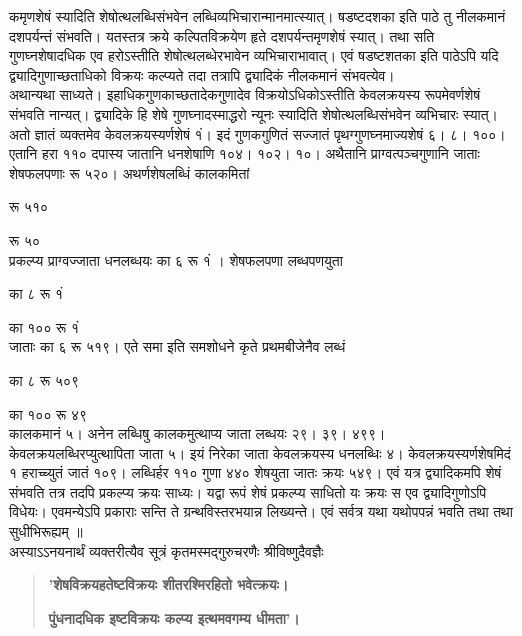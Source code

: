 \documentclass[11pt, openany]{book}
\begin{document}
\begin{sloppypar}
\hangindent=0.2in कमृणशेषं स्यादिति शेषोत्थलब्धिसंभवेन लब्धिव्यभिचारान्मानमात्स्यात्। षडष्टदशका इति पाठे तु नीलकमानं दशपर्यन्तं संभवति। यतस्तत्र क्रये कल्पितविक्रयेण हृते दशपर्यन्तमृणशेषं स्यात्। तथा सति गुणघ्नशेषादधिक एव हरोऽस्तीति शेषोत्थलब्धेरभावेन व्यभिचाराभावात्। एवं षडष्टशतका इति पाठेऽपि यदि द्व्यादिगुणाच्छताधिको विक्रयः कल्प्यते तदा तत्रापि द्व्यादिकं नीलकमानं संभवत्येव।\\

\hangindent=0.2in \hspace{0.2in}अथान्यथा साध्यते। इहाधिकगुणकाच्छतादेकगुणादेव विक्रयोऽधिकोऽस्तीति केवलक्रयस्य रूपमेवर्णशेषं संभवति नान्यत्। द्व्यादिके हि शेषे गुणघ्नादस्माद्धरो न्यूनः स्यादिति शेषोत्थलब्धिसंभवेन व्यभिचारः स्यात्। अतो ज्ञातं व्यक्तमेव केवलक्रयस्यर्णशेषं १ं। इदं गुणकगुणितं सज्जातं पृथग्गुणघ्नमाज्यशेषं ६। ८। १००। एतानि हरा ११० दपास्य जातानि धनशेषाणि १०४। १०२। १०। अथैतानि प्राग्वत्पञ्चगुणानि जाताः शेषफलपणाः रू ५२०। अथर्णशेषलब्धिं कालकमितां

\hspace{3.25in}रू ५१०

\hspace{3.25in}रू ५०\\

\hangindent=0.2in प्रकल्प्य प्राग्वज्जाता धनलब्धयः का ६ रू १ं । शेषफलपणा लब्धपणयुता

\hspace{2.1in}का ८ रू १ं

\hspace{2.1in}का १०० रू १ं\\

\hangindent=0.2in जाताः का ६ रू ५१९। एते समा इति समशोधने कृते प्रथमबीजेनैव लब्धं

\hspace{0.45in}का ८ रू ५०९

\hspace{0.45in}का १०० रू ४९\\

\hangindent=0.2in कालकमानं ५। अनेन लब्धिषु कालकमुत्थाप्य जाता लब्धयः २९। ३९। ४९९। केवलक्रयलब्धिरप्युत्थापिता जाता ५। इयं निरेका जाता केवलक्रयस्य धनलब्धिः ४। केवलक्रयस्यर्णशेषमिदं १ हराच्च्युतं जातं १०९। लब्धिर्हर ११० गुणा ४४० शेषयुता जातः क्रयः ५४९। एवं यत्र द्व्यादिकमपि शेषं संभवति तत्र तदपि प्रकल्प्य क्रयः साध्यः। यद्वा रूपं शेषं प्रकल्प्य साधितो यः क्रयः स एव द्व्यादिगुणोऽपि विधेयः। एवमन्येऽपि प्रकाराः सन्ति ते ग्रन्थविस्तरभयान्न लिख्यन्ते। एवं सर्वत्र यथा यथोपपन्नं भवति तथा तथा सुधीभिरूह्यम् ॥\\

\hangindent=0.2in \hspace{0.2in}अस्याऽऽनयनार्थं व्यक्तरीत्यैव सूत्रं कृतमस्मद्गुरुचरणैः श्रीविष्णुदैवज्ञैः\textendash

\begin{quote}
\hspace{1in}\textbf{'शेषविक्रयहतेष्टविक्रयः शीतरश्मिरहितो भवेत्क्रयः।}

\hspace{1in}\textbf{पुंधनादधिक इष्टविक्रयः कल्प्य इत्थमवगम्य धीमता'।}
\end{quote}
\end{sloppypar}
\thispagestyle{empty}
\newpage
\end{document}
